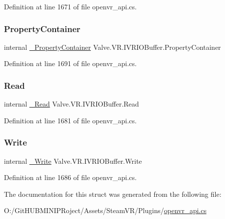 Definition at line 1671 of file openvr\+\_\+api.\+cs.

\mbox{\label{struct_valve_1_1_v_r_1_1_i_v_r_i_o_buffer_a29bd68b3897ea39ee4bc7a8510c58a4e}} 
\subsubsection{\texorpdfstring{PropertyContainer}{PropertyContainer}}
{\footnotesize\ttfamily internal \mbox{\hyperlink{struct_valve_1_1_v_r_1_1_i_v_r_i_o_buffer_abbf839546716805d584e6cba3040013a}{\+\_\+\+Property\+Container}} Valve.\+V\+R.\+I\+V\+R\+I\+O\+Buffer.\+Property\+Container}



Definition at line 1691 of file openvr\+\_\+api.\+cs.

\mbox{\label{struct_valve_1_1_v_r_1_1_i_v_r_i_o_buffer_a8cc96fd2f132261d368e4169394cbcc3}} 
\subsubsection{\texorpdfstring{Read}{Read}}
{\footnotesize\ttfamily internal \mbox{\hyperlink{struct_valve_1_1_v_r_1_1_i_v_r_i_o_buffer_ae347b94fa06c9a91e3f7bb3baa432c6a}{\+\_\+\+Read}} Valve.\+V\+R.\+I\+V\+R\+I\+O\+Buffer.\+Read}



Definition at line 1681 of file openvr\+\_\+api.\+cs.

\mbox{\label{struct_valve_1_1_v_r_1_1_i_v_r_i_o_buffer_aa8e58f602438f05b2dc53bd3622320d4}} 
\subsubsection{\texorpdfstring{Write}{Write}}
{\footnotesize\ttfamily internal \mbox{\hyperlink{struct_valve_1_1_v_r_1_1_i_v_r_i_o_buffer_a54b193825077c30de700adf41e81b975}{\+\_\+\+Write}} Valve.\+V\+R.\+I\+V\+R\+I\+O\+Buffer.\+Write}



Definition at line 1686 of file openvr\+\_\+api.\+cs.



The documentation for this struct was generated from the following file\+:\begin{DoxyCompactItemize}
\item 
O\+:/\+Git\+H\+U\+B\+M\+I\+N\+I\+P\+Roject/\+Assets/\+Steam\+V\+R/\+Plugins/\mbox{\hyperlink{openvr__api_8cs}{openvr\+\_\+api.\+cs}}\end{DoxyCompactItemize}

